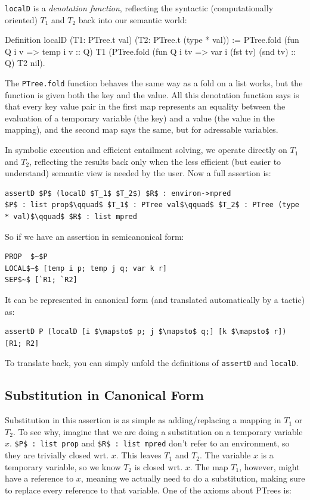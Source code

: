 \documentclass{puthesis}
\begin{document}
\lstinline{localD} is a \emph{denotation function}, reflecting the
syntactic (computationally oriented) $T_1$ and $T_2$ back into our
semantic world:

Definition localD (T1: PTree.t val) (T2: PTree.t (type * val)) :=
  PTree.fold (fun Q i v => temp i v :: Q) T1
    (PTree.fold (fun Q i tv => var i (fst tv) (snd tv) :: Q) T2 nil).


The \lstinline|PTree.fold| function behaves the same way as a fold on
a list works, but the function is given both the key and the
value. All this denotation function says is that every key value pair
in the first map represents an equality between the evaluation of a
temporary variable (the key) and a value (the value in the mapping),
and the second map says the same, but for adressable variables.


In symbolic execution and efficient entailment
solving, we operate directly on $T_1$ and $T_2$, reflecting the
results back only when the less efficient (but easier to understand)
semantic view is needed by the user. 
Now a full assertion is:

\begin{lstlisting}
assertD $P$ (localD $T_1$ $T_2$) $R$ : environ->mpred
$P$ : list prop$\qquad$ $T_1$ : PTree val$\qquad$ $T_2$ : PTree (type * val)$\qquad$ $R$ : list mpred
\end{lstlisting}

So if we have an assertion in semicanonical form:

\begin{lstlisting}
PROP  $~$P
LOCAL$~$ [temp i p; temp j q; var k r]
SEP$~$ [`R1; `R2]
\end{lstlisting}

It can be represented in canonical form (and translated automatically
by a tactic) as:

\begin{lstlisting}
assertD P (localD [i $\mapsto$ p; j $\mapsto$ q;] [k $\mapsto$ r]) [R1; R2]
\end{lstlisting}

To translate back, you can simply unfold the definitions of \lstinline|assertD|
and \lstinline|localD|.

\subsection{Substitution in Canonical Form}
\label{sec:subst_canon}
Substitution in this assertion is as simple as adding/replacing a
mapping in $T_1$ or $T_2$. To see why, imagine that we are doing a
substitution on a temporary variable $x$.  \lstinline|$P$ : list prop|
and \lstinline|$R$ : list mpred| don't refer to an environment, so
they are trivially closed wrt.  $x$. This leaves $T_1$ and $T_2$. The
variable $x$ is a temporary variable, so we know $T_2$ is closed
wrt. $x$.  The map $T_1$, however, might have a reference to $x$,
meaning we actually need to do a substitution, making sure to replace
every reference to that variable. One of the axioms about PTrees
is:
\end{document}
